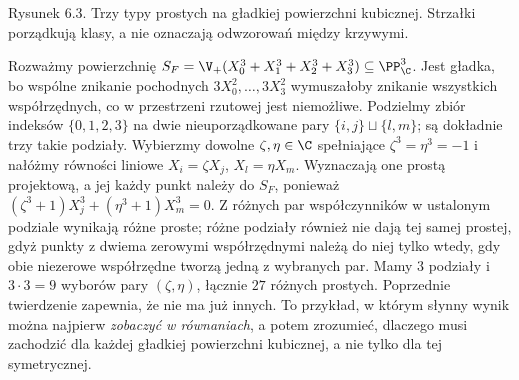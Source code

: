 \begin{center}
\begin{minipage}{\linewidth}
\centering
{}

{\small Rysunek 6.3. Trzy typy prostych na gładkiej powierzchni kubicznej. Strzałki porządkują klasy, a nie oznaczają odwzorowań między krzywymi.}\par
\end{minipage}
\end{center}

\begin{przyklad}
\label{prz:ga6-fermat}
Rozważmy powierzchnię
$S_F=\V_+(X_0^3+X_1^3+X_2^3+X_3^3)\subseteq\PP^3_\C$.
Jest gładka, bo wspólne znikanie pochodnych
$3X_0^2,\ldots,3X_3^2$ wymuszałoby znikanie
wszystkich współrzędnych, co w przestrzeni rzutowej
jest niemożliwe. Podzielmy zbiór indeksów
$\{0,1,2,3\}$ na dwie nieuporządkowane pary
$\{i,j\}\sqcup\{l,m\}$; są dokładnie trzy takie
podziały. Wybierzmy dowolne $\zeta,\eta\in\C$
spełniające $\zeta^3=\eta^3=-1$ i nałóżmy
równości liniowe $X_i=\zeta X_j$,
$X_l=\eta X_m$. Wyznaczają one prostą projektową,
a jej każdy punkt należy do $S_F$, ponieważ
$(\zeta^3+1)X_j^3+(\eta^3+1)X_m^3=0$.
Z różnych par współczynników w ustalonym podziale wynikają różne proste;
różne podziały również nie dają tej samej prostej, gdyż
punkty z dwiema zerowymi współrzędnymi należą do niej tylko
wtedy, gdy obie niezerowe współrzędne tworzą jedną z wybranych par.
Mamy $3$ podziały i $3\cdot3=9$ wyborów pary
$(\zeta,\eta)$, łącznie $27$ różnych prostych.
Poprzednie twierdzenie zapewnia, że nie ma już innych.
To przykład, w którym słynny wynik można najpierw
\emph{zobaczyć w równaniach}, a potem zrozumieć,
dlaczego musi zachodzić dla każdej gładkiej powierzchni
kubicznej, a nie tylko dla tej symetrycznej.
\end{przyklad}

